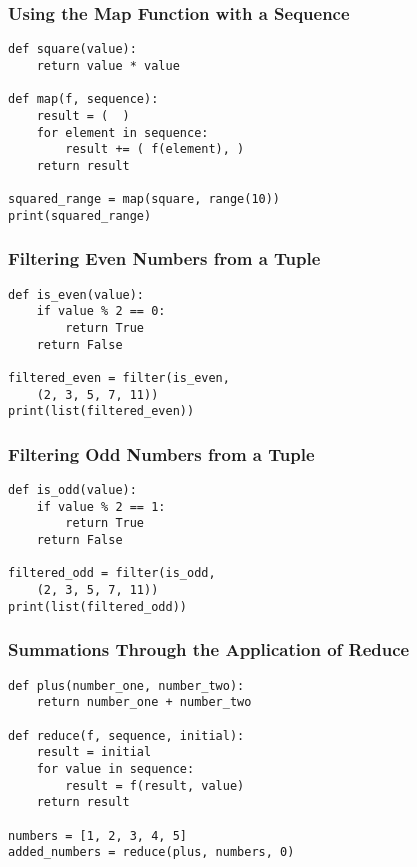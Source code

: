 \documentclass[14pt,aspectratio=169]{beamer}
\begin{document}
%
\begin{frame}[fragile]
  \frametitle{Using the Map Function with a Sequence}
  \begin{minipage}{6in}
    \vspace*{.15in}
    \begin{verbatim}
def square(value):
    return value * value

def map(f, sequence):
    result = (  )
    for element in sequence:
        result += ( f(element), )
    return result

squared_range = map(square, range(10))
print(squared_range)
    \end{verbatim}
  \end{minipage}
\end{frame}

%
\begin{frame}[fragile]
  \frametitle{Filtering Even Numbers from a Tuple}
  \begin{minipage}{6in}
    \vspace*{.15in}
    \begin{verbatim}
def is_even(value):
    if value % 2 == 0:
        return True
    return False

filtered_even = filter(is_even,
    (2, 3, 5, 7, 11))
print(list(filtered_even))
    \end{verbatim}
  \end{minipage}
\end{frame}

%
\begin{frame}[fragile]
  \frametitle{Filtering Odd Numbers from a Tuple}
  \begin{minipage}{6in}
    \vspace*{.15in}
    \begin{verbatim}
def is_odd(value):
    if value % 2 == 1:
        return True
    return False

filtered_odd = filter(is_odd,
    (2, 3, 5, 7, 11))
print(list(filtered_odd))
    \end{verbatim}
  \end{minipage}
\end{frame}

%
\begin{frame}[fragile]
  \frametitle{Summations Through the Application of Reduce}
  \begin{minipage}{6in}
    \vspace*{.15in}
    \begin{verbatim}
def plus(number_one, number_two):
    return number_one + number_two

def reduce(f, sequence, initial):
    result = initial
    for value in sequence:
        result = f(result, value)
    return result

numbers = [1, 2, 3, 4, 5]
added_numbers = reduce(plus, numbers, 0)
    \end{verbatim}
  \end{minipage}
\end{frame}
\end{document}

